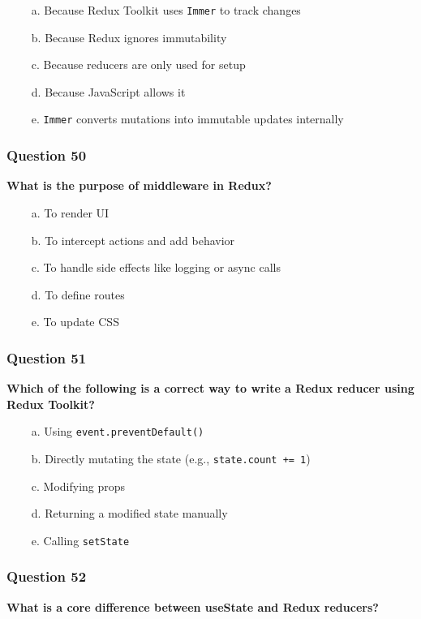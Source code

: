 \documentclass{article}
\newcommand{\cmark}{\textcolor{green}{\ding{51}}} %
\newcommand{\xmark}{\textcolor{red}{\ding{55}}}   %
\begin{document}
\begin{itemize}
  \item[\cmark\ a.] Because Redux Toolkit uses \texttt{Immer} to track changes
  \item[\xmark\ b.] Because Redux ignores immutability
  \item[\xmark\ c.] Because reducers are only used for setup
  \item[\xmark\ d.] Because JavaScript allows it
  \item[\cmark\ e.] \texttt{Immer} converts mutations into immutable updates internally
\end{itemize}

\subsubsection*{Question 50}
\textbf{What is the purpose of middleware in Redux?}

\begin{itemize}
  \item[\xmark\ a.] To render UI
  \item[\cmark\ b.] To intercept actions and add behavior
  \item[\xmark\ c.] To handle side effects like logging or async calls
  \item[\xmark\ d.] To define routes
  \item[\xmark\ e.] To update CSS
\end{itemize}

\subsubsection*{Question 51}
\textbf{Which of the following is a correct way to write a Redux reducer using Redux Toolkit?}

\begin{itemize}
  \item[\xmark\ a.] Using \texttt{event.preventDefault()}
  \item[\cmark\ b.] Directly mutating the state (e.g., \texttt{state.count += 1})
  \item[\xmark\ c.] Modifying props
  \item[\xmark\ d.] Returning a modified state manually
  \item[\cmark\ e.] Calling \texttt{setState}
\end{itemize}

\subsubsection*{Question 52}
\textbf{What is a core difference between useState and Redux reducers?}
\end{document}

